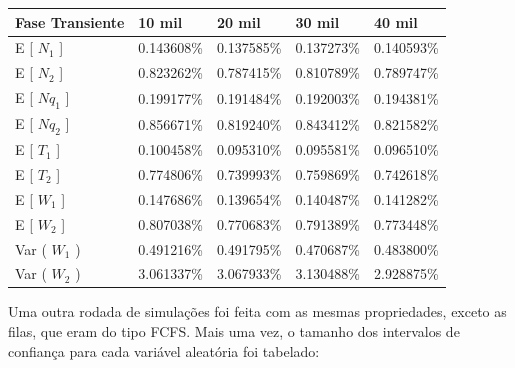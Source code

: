 \documentclass[a4paper,10pt]{article}
\begin{document}
\begin{center}
\begin{tabular} { | l | l | l | l | l | }
    \hline
    Fase Transiente & 10 mil     & 20 mil     & 30 mil     & 40 mil \\ \hline
    E [ $N_1$ ]     & 0.143608\% & 0.137585\% & 0.137273\% & 0.140593\% \\ \hline
    E [ $N_2$ ]     & 0.823262\% & 0.787415\% & 0.810789\% & 0.789747\% \\ \hline
    E [ $Nq_1$ ]    & 0.199177\% & 0.191484\% & 0.192003\% & 0.194381\% \\ \hline
    E [ $Nq_2$ ]    & 0.856671\% & 0.819240\% & 0.843412\% & 0.821582\% \\ \hline
    E [ $T_1$ ]     & 0.100458\% & 0.095310\% & 0.095581\% & 0.096510\% \\ \hline
    E [ $T_2$ ]     & 0.774806\% & 0.739993\% & 0.759869\% & 0.742618\% \\ \hline
    E [ $W_1$ ]     & 0.147686\% & 0.139654\% & 0.140487\% & 0.141282\% \\ \hline
    E [ $W_2$ ]     & 0.807038\% & 0.770683\% & 0.791389\% & 0.773448\% \\ \hline
    Var ( $W_1$ )   & 0.491216\% & 0.491795\% & 0.470687\% & 0.483800\% \\ \hline
    Var ( $W_2$ )   & 3.061337\% & 3.067933\% & 3.130488\% & 2.928875\% \\ \hline
\end{tabular}
\end{center}

    Uma outra rodada de simulações foi feita com as mesmas propriedades, exceto as filas, que eram do tipo FCFS. Mais uma vez, o tamanho dos intervalos de confiança para cada variável aleatória foi tabelado:
\end{document}
